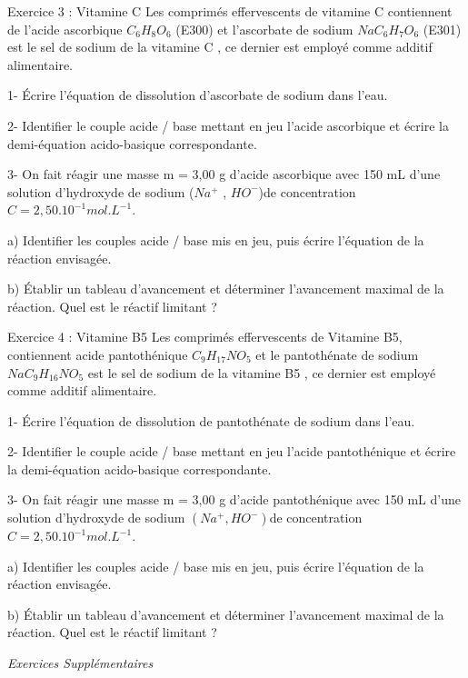 \documentclass[12pt, french]{article}
\begin{document}
\begin{Box2}{Exercice 3 : Vitamine C }
Les comprimés effervescents de vitamine C contiennent de l’acide ascorbique $C_6H_8O_6$ (E300) et l’ascorbate de sodium $NaC_6H_7O_6$ (E301) est le sel de sodium de la vitamine C , ce dernier est
employé comme additif alimentaire.

   1- Écrire l’équation de dissolution d’ascorbate de sodium dans l’eau.

   2- Identifier le couple acide / base mettant en jeu l’acide ascorbique et écrire la demi-équation
acido-basique correspondante.

   3- On fait réagir une masse m = 3,00 g d’acide ascorbique avec 150 mL d’une solution d’hydroxyde de sodium ($Na^+$ , $HO^-$)de concentration $C=2,50.10^{-1}mol.L^{-1}$.

a) Identifier les couples acide / base mis en jeu, puis écrire l’équation de la réaction envisagée.

   b) Établir un tableau d’avancement et déterminer l’avancement maximal de la réaction. Quel est
le réactif limitant ?
\end{Box2}

\begin{Box2}{Exercice 4 : Vitamine B5}
   Les comprimés effervescents de Vitamine B5, contiennent acide pantothénique $C_9H_{17}NO_5$ et le
   pantothénate de sodium $NaC_9H_{16}NO_5$ est le sel de sodium de la vitamine B5 , ce dernier est
employé comme additif alimentaire.

   1- Écrire l’équation de dissolution de pantothénate de sodium dans l’eau.

2- Identifier le couple acide / base mettant en jeu l’acide pantothénique et écrire la demi-équation acido-basique correspondante.

3- On fait réagir une masse m = 3,00 g d’acide pantothénique avec 150 mL d’une solution
d’hydroxyde de sodium $(Na^+, HO^-)$de concentration $C=2,50.10^{-1} mol.L^{-1}$.

a) Identifier les couples acide / base mis en jeu, puis écrire l’équation de la réaction envisagée.

b) Établir un tableau d’avancement et déterminer l’avancement maximal de la réaction. Quel est
le réactif limitant ?
\end{Box2}

\vspace{3cm}
\begin{center}
   \Large{ \em{Exercices Supplémentaires}}
\end{center}
\end{document}
